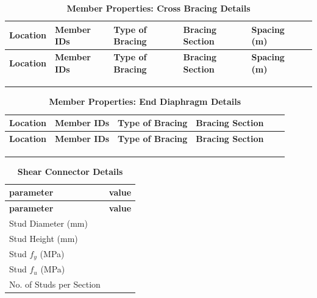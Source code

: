 \documentclass[12pt,a4paper]{report}
\numberwithin{table}{chapter}
\numberwithin{figure}{chapter}
\newcommand{\ReportCompactTable}{\setlength{\tabcolsep}{2pt}}
\newcommand{\ReportMinorGap}{\vspace{0.4em}}
\newcommand{\ReportMajorGap}{\vspace{2em}}
\newcommand{\ReportTableLeft}{\setlength{\LTleft}{0pt}\setlength{\LTright}{\fill}}
\begin{document}
\newpage

\ReportMinorGap
\ReportCompactTable
\ReportTableLeft

\begin{longtable}{|L{2.2cm}|L{2.2cm}|L{3.0cm}|L{2.5cm}|C{1.8cm}|C{1.8cm}|}
\caption{\textbf{Member Properties: Cross Bracing Details}}\\
\hline
\textbf{Location} & \textbf{Member IDs} & \textbf{Type of Bracing} & \textbf{Bracing Section} & \textbf{Spacing (m)} \\
\hline
\endfirsthead
\hline
\textbf{Location} & \textbf{Member IDs} & \textbf{Type of Bracing} & \textbf{Bracing Section} & \textbf{Spacing (m)} \\
\hline
\endhead

 &  &  &  &  \\[6pt]
\hline
 &  &  &  &  \\[6pt]
\hline
 &  &  &  &  \\[6pt]
\hline
\end{longtable}

\ReportMinorGap
\noindent
\ReportCompactTable
\ReportTableLeft

\begin{longtable}{|L{2.2cm}|L{2.2cm}|L{3.0cm}|L{2.5cm}|C{1.8cm}|C{1.8cm}|}
\caption{\textbf{Member Properties: End Diaphragm Details}}\\
\hline
\textbf{Location} & \textbf{Member IDs} & \textbf{Type of Bracing} & \textbf{Bracing Section} \\
\hline
\endfirsthead
\hline
\textbf{Location} & \textbf{Member IDs} & \textbf{Type of Bracing} & \textbf{Bracing Section} \\
\hline
\endhead

 &  &  &  \\[6pt]
\hline
 &  &  &  \\[6pt]
\hline
 &  &  &  \\[6pt]
\hline
\end{longtable}



\label{subsec:shear-connectors}

\ReportMajorGap

\ReportMinorGap
\begin{longtable}{|L{5.5cm}|p{10.0cm}|}
\caption{\textbf{Shear Connector Details}}\\
\hline
\textbf{parameter} & \textbf{value} \\
\hline
\endfirsthead
\hline
\textbf{parameter} & \textbf{value} \\
\hline
\endhead

\textnormal{Stud Diameter (mm)} &  \\[6pt]
\hline
\textnormal{Stud Height (mm)} &  \\[6pt]
\hline
\textnormal{Stud $f_y$ (MPa)} &  \\[6pt]
\hline
\textnormal{Stud $f_u$ (MPa)} &  \\[6pt]
\hline
\textnormal{No. of Studs per Section} &  \\[6pt]
\hline
\end{longtable}
\end{document}
